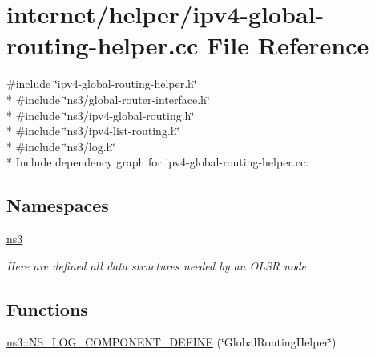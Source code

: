 \hypertarget{ipv4-global-routing-helper_8cc}{}\section{internet/helper/ipv4-\/global-\/routing-\/helper.cc File Reference}
\label{ipv4-global-routing-helper_8cc}
{\ttfamily \#include \char`\"{}ipv4-\/global-\/routing-\/helper.\+h\char`\"{}}\\*
{\ttfamily \#include \char`\"{}ns3/global-\/router-\/interface.\+h\char`\"{}}\\*
{\ttfamily \#include \char`\"{}ns3/ipv4-\/global-\/routing.\+h\char`\"{}}\\*
{\ttfamily \#include \char`\"{}ns3/ipv4-\/list-\/routing.\+h\char`\"{}}\\*
{\ttfamily \#include \char`\"{}ns3/log.\+h\char`\"{}}\\*
Include dependency graph for ipv4-\/global-\/routing-\/helper.cc\+:
\subsection*{Namespaces}
\begin{DoxyCompactItemize}
\item 
 \hyperlink{namespacens3}{ns3}
\begin{DoxyCompactList}\small\item\em Here are defined all data structures needed by an O\+L\+SR node. \end{DoxyCompactList}\end{DoxyCompactItemize}
\subsection*{Functions}
\begin{DoxyCompactItemize}
\item 
\hyperlink{namespacens3_ad94922df28b24c9a5981b8c6a28f10a4}{ns3\+::\+N\+S\+\_\+\+L\+O\+G\+\_\+\+C\+O\+M\+P\+O\+N\+E\+N\+T\+\_\+\+D\+E\+F\+I\+NE} (\char`\"{}Global\+Routing\+Helper\char`\"{})
\end{DoxyCompactItemize}
